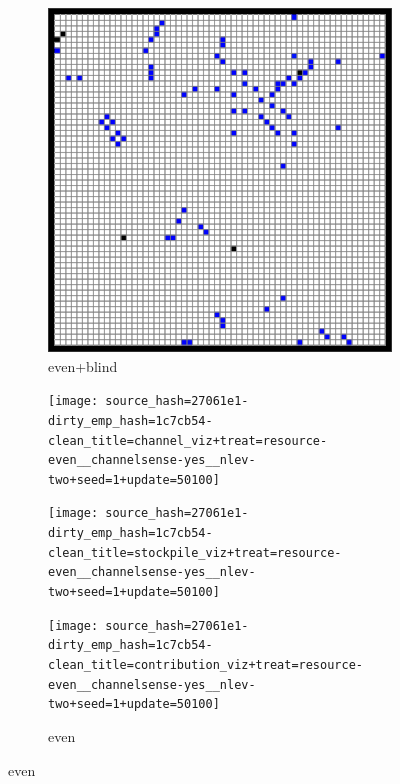 \begin{figure}[!htbp]
\begin{center}
\begin{subfigure}[b]{\textwidth}
\begin{minipage}{0.2\textwidth}
  \end{minipage}
  \begin{minipage}{0.2\textwidth}
  \includegraphics[width=\textwidth]{img/source_hash=27061e1-dirty_emp_hash=1c7cb54-clean_title=contribution_viz+treat=resource-even__channelsense-no__nlev-two+seed=1+update=50100}
  \end{minipage}
  \begin{minipage}{0.2\textwidth}
  \caption{
  even+blind
  }
  \label{fig:TODO}
  \end{minipage}
\end{subfigure}

\begin{subfigure}[b]{\textwidth}
  \begin{minipage}{0.2\textwidth}
  \texttt{[image: source\_hash=27061e1-dirty\_emp\_hash=1c7cb54-clean\_title=channel\_viz+treat=resource-even\_\_channelsense-yes\_\_nlev-two+seed=1+update=50100]}
  \end{minipage}
  \begin{minipage}{0.2\textwidth}
  \texttt{[image: source\_hash=27061e1-dirty\_emp\_hash=1c7cb54-clean\_title=stockpile\_viz+treat=resource-even\_\_channelsense-yes\_\_nlev-two+seed=1+update=50100]}
  \end{minipage}
  \begin{minipage}{0.2\textwidth}
  \texttt{[image: source\_hash=27061e1-dirty\_emp\_hash=1c7cb54-clean\_title=contribution\_viz+treat=resource-even\_\_channelsense-yes\_\_nlev-two+seed=1+update=50100]}
  \end{minipage}
  \begin{minipage}{0.2\textwidth}
    \caption{
    even
    }
  \label{fig:TODO}
  \end{minipage}
\end{subfigure}


\end{center}
\end{figure}
